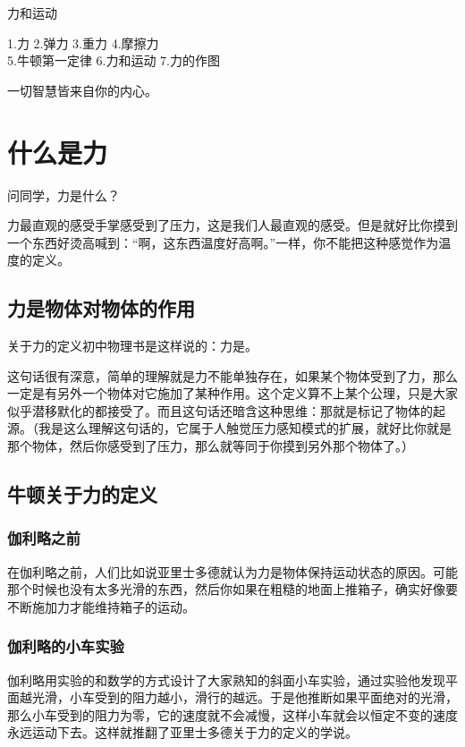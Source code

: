 \documentclass[12pt,twoside]{exam}
\newcommand{\keti}{力和运动}
\newcommand{\zhongdian}{1.力 2.弹力 3.重力 4.摩擦力 \\5.牛顿第一定律 6.力和运动 7.力的作图}
\begin{document}
\vspace*{80pt}
\keti \par
\zhongdian \par
\begin{knowledge}
\begin{flushright}
\begin{notecard}{12em}
\ttfamily
一切智慧皆来自你的内心。
\end{notecard}
\end{flushright}
\section{什么是力}
问同学，力是什么？

力最直观的感受手掌感受到了压力，这是我们人最直观的感受。但是就好比你摸到一个东西好烫高喊到：“啊，这东西温度好高啊。”一样，你不能把这种感觉作为温度的定义。

\subsection{力是物体对物体的作用}
关于力的定义初中物理书是这样说的：力是。

这句话很有深意，简单的理解就是力不能单独存在，如果某个物体受到了力，那么一定是有另外一个物体对它施加了某种作用。这个定义算不上某个公理，只是大家似乎潜移默化的都接受了。而且这句话还暗含这种思维：那就是标记了物体的起源。（我是这么理解这句话的，它属于人触觉压力感知模式的扩展，就好比你就是那个物体，然后你感受到了压力，那么就等同于你摸到另外那个物体了。）


\subsection{牛顿关于力的定义}
\subsubsection{伽利略之前}
在伽利略之前，人们比如说亚里士多德就认为力是物体保持运动状态的原因。可能那个时候也没有太多光滑的东西，然后你如果在粗糙的地面上推箱子，确实好像要不断施加力才能维持箱子的运动。

\subsubsection{伽利略的小车实验}
伽利略用实验的和数学的方式设计了大家熟知的斜面小车实验，通过实验他发现平面越光滑，小车受到的阻力越小，滑行的越远。于是他推断如果平面绝对的光滑，那么小车受到的阻力为零，它的速度就不会减慢，这样小车就会以恒定不变的速度永远运动下去。这样就推翻了亚里士多德关于力的定义的学说。


\end{knowledge}
\end{document}
